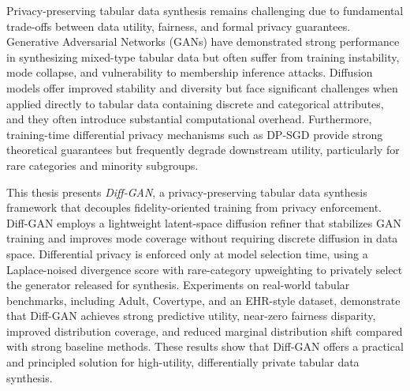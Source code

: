 

\begin{enabstract}
  Privacy-preserving tabular data synthesis remains challenging due to fundamental trade-offs between data utility, fairness, and formal privacy guarantees. Generative Adversarial Networks (GANs) have demonstrated strong performance in synthesizing mixed-type tabular data but often suffer from training instability, mode collapse, and vulnerability to membership inference attacks. Diffusion models offer improved stability and diversity but face significant challenges when applied directly to tabular data containing discrete and categorical attributes, and they often introduce substantial computational overhead. Furthermore, training-time differential privacy mechanisms such as DP-SGD provide strong theoretical guarantees but frequently degrade downstream utility, particularly for rare categories and minority subgroups.

  This thesis presents \textit{Diff-GAN}, a privacy-preserving tabular data synthesis framework that decouples fidelity-oriented training from privacy enforcement. Diff-GAN employs a lightweight latent-space diffusion refiner that stabilizes GAN training and improves mode coverage without requiring discrete diffusion in data space. Differential privacy is enforced only at model selection time, using a Laplace-noised divergence score with rare-category upweighting to privately select the generator released for synthesis. Experiments on real-world tabular benchmarks, including Adult, Covertype, and an EHR-style dataset, demonstrate that Diff-GAN achieves strong predictive utility, near-zero fairness disparity, improved distribution coverage, and reduced marginal distribution shift compared with strong baseline methods. These results show that Diff-GAN offers a practical and principled solution for high-utility, differentially private tabular data synthesis.

\end{enabstract}